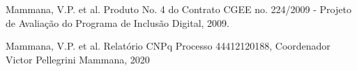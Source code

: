 \documentclass[
12pt,		%
openright,	%
twoside,  %
a4paper,			%
chapter=TITLE,		%
english,			%
french,				%
spanish,			%
brazil				%
]{USPSC-classe/USPSC}
\begin{document}
\begin{flushleft}
\begin{flushleft}
\begin{flushleft}
\begin{flushleft}
\begin{flushleft}
\begin{flushleft}
\begin{flushleft}
\begin{flushleft}
\begin{flushleft}
\begin{flushleft}
[CGEE, 2010a] Mammana, V.P. et al. Produto No. 4 do Contrato CGEE no. 224/2009 - Projeto de Avalia\c{c}\~ao do Programa de Inclus\~ao Digital, 2009.
\end{flushleft}


\end{flushleft}


\end{flushleft}


\end{flushleft}


\end{flushleft}


\end{flushleft}


\end{flushleft}


\end{flushleft}


\end{flushleft}


\end{flushleft}


\begin{flushleft}
\begin{flushleft}
\begin{flushleft}
\begin{flushleft}
\begin{flushleft}
\begin{flushleft}
\begin{flushleft}
\begin{flushleft}
\begin{flushleft}
\begin{flushleft}
[CNPq, 2020a] Mammana, V.P. et al. Relat\'orio CNPq Processo 44412120188, Coordenador Victor Pellegrini Mammana, 2020
\end{flushleft}


\end{flushleft}


\end{flushleft}


\end{flushleft}


\end{flushleft}


\end{flushleft}


\end{flushleft}


\end{flushleft}


\end{flushleft}


\end{flushleft}
\end{document}
